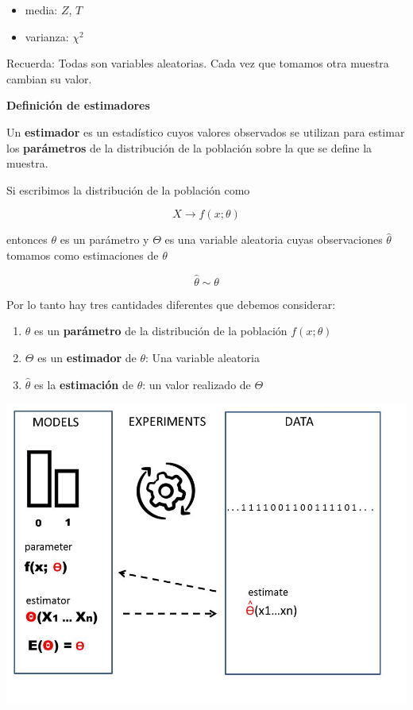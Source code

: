 \documentclass[
]{book}
\providecommand{\tightlist}{%
  \setlength{\itemsep}{0pt}\setlength{\parskip}{0pt}}
\begin{document}
\begin{itemize}
\tightlist
\item
  media: \(Z\), \(T\)
\item
  varianza: \(\chi^2\)
\end{itemize}

Recuerda: Todas son variables aleatorias. Cada vez que tomamos otra muestra cambian su valor.

\textbf{Definición de estimadores}

Un \textbf{estimador} es un estadístico cuyos valores observados se utilizan para estimar los \textbf{parámetros} de la distribución de la población sobre la que se define la muestra.

Si escribimos la distribución de la población como

\[X \rightarrow f(x; \theta)\]

entonces \(\theta\) es un parámetro y \(\Theta\) es una variable aleatoria cuyas observaciones \(\hat{\theta}\) tomamos como estimaciones de \(\theta\)

\[\hat{\theta} \sim \theta\]

Por lo tanto hay tres cantidades diferentes que debemos considerar:

\begin{enumerate}
\def\labelenumi{\arabic{enumi}.}
\tightlist
\item
  \(\theta\) es un \textbf{parámetro} de la distribución de la población \(f(x; \theta)\)
\item
  \(\Theta\) es un \textbf{estimador} de \(\theta\): Una variable aleatoria
\item
  \(\hat{\theta}\) es la \textbf{estimación} de \(\theta\): un valor realizado de \(\Theta\)
\end{enumerate}

\includegraphics{./figures/estimator.JPG}
\end{document}
